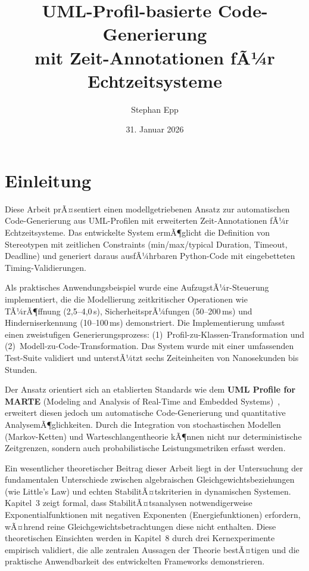 ﻿\documentclass[a4paper,12pt]{scrreprt}
\title{\textbf{UML-Profil-basierte Code-Generierung}\\
	\large mit Zeit-Annotationen fÃ¼r Echtzeitsysteme}
\author{Stephan Epp}
\date{31. Januar 2026}
\theoremstyle{definition}
\begin{document}
	
\maketitle
\tableofcontents
\newpage

\section{Einleitung}

Diese Arbeit prÃ¤sentiert einen modellgetriebenen Ansatz zur automatischen
Code-Gene\-rierung aus UML-Profilen mit erweiterten Zeit-Annotationen fÃ¼r
Echtzeitsysteme. Das entwickelte System ermÃ¶glicht die Definition von
Stereotypen mit zeitlichen Constraints (min/max/typical Duration, Timeout,
Deadline) und generiert daraus ausfÃ¼hrbaren Py\-thon-Code mit eingebetteten
Timing-Validierungen.

Als praktisches Anwendungsbeispiel wurde eine AufzugstÃ¼r-Steuerung
implementiert, die die Modellierung zeitkritischer Operationen wie
TÃ¼rÃ¶ffnung (2{,}5--4{,}0\,s), SicherheitsprÃ¼fungen (50--200\,ms) und
Hinderniserkennung (10--100\,ms) demonstriert. Die Implementierung umfasst
einen zweistufigen Generierungsprozess: (1)~Profil-zu-Klassen-Transfor\-mation
und (2)~Modell-zu-Code-Transformation. Das System wurde mit einer
umfassenden Test-Suite validiert und unterstÃ¼tzt sechs Zeiteinheiten von
Nanosekunden bis Stunden.

Der Ansatz orientiert sich an etablierten Standards wie dem
\textbf{UML Profile for MARTE} (Modeling and Analysis of Real-Time and
Embedded Systems)~\cite{marte}, erweitert diesen jedoch um automatische
Code-Generierung und quantitative AnalysemÃ¶glichkeiten. Durch die Integration
von stochastischen Modellen (Markov-Ketten) und Warteschlangentheorie
kÃ¶nnen nicht nur deterministische Zeitgrenzen, sondern auch probabilistische
Leistungsmetriken erfasst werden.

Ein wesentlicher theoretischer Beitrag dieser Arbeit liegt in der Untersuchung
der fundamentalen Unterschiede zwischen algebraischen Gleichgewichtsbeziehungen
(wie Little's Law) und echten StabilitÃ¤tskriterien in dynamischen Systemen.
Kapitel~3 zeigt formal, dass StabilitÃ¤tsanalysen notwendigerweise
Exponentialfunktionen mit negativen Exponenten (Energiefunktionen) erfordern,
wÃ¤hrend reine Gleichgewichtsbetrachtungen diese nicht enthalten. Diese
theoretischen Einsichten werden in Kapitel~8 durch drei Kernexperimente
empirisch validiert, die alle zentralen Aussagen der Theorie bestÃ¤tigen und
die praktische Anwendbarkeit des entwickelten Frameworks demonstrieren.
\end{document}
